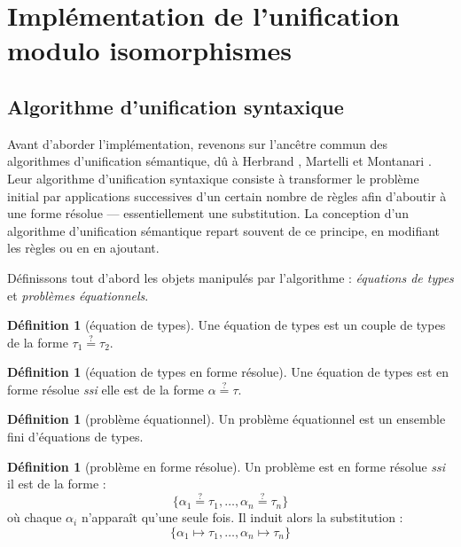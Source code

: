 \documentclass[a4paper]{report}
\theoremstyle{definition}
\newtheorem{definition}[theoreme]{Définition}
\newcommand{\qeq}{\stackrel {\scriptscriptstyle ?} =}
\newcommand{\ssi}{\textit{ssi}\xspace}
\begin{document}

\section{Implémentation de l'unification modulo isomorphismes}


\subsection{Algorithme d'unification syntaxique}

Avant d'aborder l'implémentation, revenons sur l'ancêtre commun des algorithmes d'unification sémantique, dû à Herbrand \cite{Herbrand}, Martelli et Montanari \cite{Martelli_Montanari}. Leur algorithme d'unification syntaxique consiste à transformer le problème initial par applications successives d'un certain nombre de règles afin d'aboutir à une forme résolue — essentiellement une substitution. La conception d'un algorithme d'unification sémantique repart souvent de ce principe, en modifiant les règles ou en en ajoutant.

Définissons tout d'abord les objets manipulés par l'algorithme : \emph{équations de types} et \emph{problèmes équationnels}.

\begin{definition}[équation de types]
  Une équation de types est un couple de types de la forme $\tau_1 \qeq \tau_2$.
\end{definition}

\begin{definition}[équation de types en forme résolue]
  Une équation de types est en forme résolue \ssi elle est de la forme $\alpha \qeq \tau$.
\end{definition}

\begin{definition}[problème équationnel]
  Un problème équationnel est un ensemble fini d'équations de types.
\end{definition}

\begin{definition}[problème en forme résolue]
  Un problème est en forme résolue \ssi il est de la forme :
  \[ \{ \alpha_1 \qeq \tau_1, \dots, \alpha_n \qeq \tau_n \} \]
  où chaque $\alpha_i$ n'apparaît qu'une seule fois. Il induit alors la substitution :
  \[ \{ \alpha_1 \mapsto \tau_1, \dots, \alpha_n \mapsto \tau_n \} \]
\end{definition}
\end{document}
